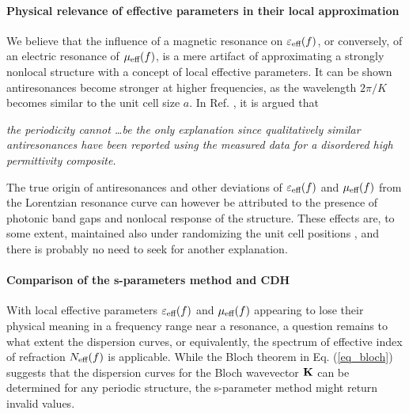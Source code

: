 \paragraph{Physical relevance of effective parameters in their local approximation}%
We believe that the influence of a magnetic resonance on $\varepsilon_{\text{eff} }(f)$, or conversely, of an electric resonance of $\mu_{\text{eff} }(f)$, is a mere artifact of approximating a strongly nonlocal structure with a concept of local effective parameters. It can be shown antiresonances become stronger at higher frequencies, as the wavelength $2\pi/K$ becomes similar to the unit cell size $a$. 
In Ref. \cite{wallen2011anti}, it is argued that %
\begin{displayquote}
\textit{the periodicity cannot \ldots be the only explanation since qualitatively similar antiresonances have been reported using the measured data for a disordered high permittivity composite.}
\end{displayquote}
The true origin of antiresonances and other deviations of $\varepsilon_{\text{eff} }(f)$ and $\mu_{\text{eff} }(f)$ from the Lorentzian resonance curve can however be attributed to the presence of photonic band gaps and nonlocal response of the structure. These effects are, to some extent, maintained also under randomizing the unit cell positions \cite{peng2007},   
and there is probably no need to seek for another explanation. %


\paragraph{Comparison of the s-parameters method and CDH}%
With local effective parameters $\varepsilon_{\text{eff} }(f)$ and $\mu_{\text{eff} }(f)$ appearing to lose their physical meaning in a frequency range near a resonance, a question remains to what extent the dispersion curves, or equivalently, the spectrum of effective index of refraction $N_{\text{eff} }(f)$ is applicable. While the Bloch theorem in Eq. (\ref{eq_bloch}) suggests that the dispersion curves for the Bloch wavevector ${\mathbf{K}}$ can be determined for any periodic structure, the s-parameter method might return invalid values.

